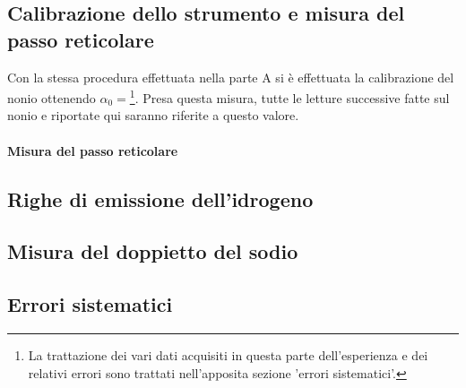 \documentclass[a4paper,10pt]{article}
\begin{document}
\subsection{Calibrazione dello strumento e misura del passo reticolare}
Con la stessa procedura effettuata nella parte A si è effettuata la calibrazione del nonio ottenendo $\alpha_0 = $\footnote{La trattazione dei vari dati acquisiti in questa parte dell'esperienza e dei relativi errori sono trattati nell'apposita sezione 'errori sistematici'.}. Presa questa misura, tutte le letture successive fatte sul nonio e riportate qui saranno riferite a questo valore.
\paragraph{Misura del passo reticolare}

\subsection{Righe di emissione dell'idrogeno}


\subsection{Misura del doppietto del sodio}



\subsection{Errori sistematici}
\end{document}
